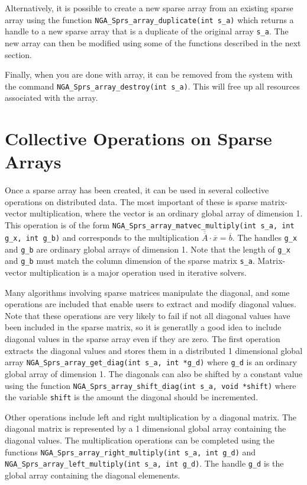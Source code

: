 Alternatively, it is possible to create a new sparse array from an existing
sparse array using the function \texttt{NGA\_Sprs\_array\_duplicate(int s\_a)}
which returns a handle to a new sparse array that is a duplicate of the original
array \texttt{s\_a}. The new array can then be modified using some of the
functions described in the next section.

Finally, when you are done with array, it can be removed from the system with
the command \texttt{NGA\_Sprs\_array\_destroy(int s\_a)}. This will free up all
resources associated with the array.

\section{Collective Operations on Sparse Arrays}

Once a sparse array has been created, it can be used in several collective
operations on distributed data. The most important of these is sparse
matrix-vector multiplication, where the vector is an ordinary global array of
dimension 1. This operation is of the form
\texttt{NGA\_Sprs\_array\_matvec\_multiply(int s\_a, int g\_x, int g\_b)}
and corresponds to the multiplication $\overline{\overline{A}}\cdot\overline{x}
=\overline{b}$. The handles \texttt{g\_x} and \texttt{g\_b} are ordinary global
arrays of dimension 1. Note that the length of \texttt{g\_x} and \texttt{g\_b}
must match the column dimension of the sparse matrix \texttt{s\_a}. Matrix-vector
multiplication is a major operation used in iterative solvers.

Many algorithms involving sparse matrices manipulate the diagonal,
and some operations are included that enable users to extract and modify
diagonal values. Note that these operations are very likely to fail if not all
diagonal values have been included in the sparse matrix, so it is generatlly a
good idea to include diagonal values in the sparse array even if they are zero.
The first operation extracts the diagonal values and stores them in a
distributed 1 dimensional global array \texttt{NGA\_Sprs\_array\_get\_diag(int
s\_a, int *g\_d)} where \texttt{g\_d} is an ordinary global array of dimension
1.  The diagonals can also be shifted by a constant value using the function
\texttt{NGA\_Sprs\_array\_shift\_diag(int s\_a, void *shift)} where the variable
\texttt{shift} is the amount the diagonal should be incremented.

Other operations include left and right multiplication by a diagonal matrix. The
diagonal matrix is represented by a 1 dimensional global array containing the
diagonal values. The multiplication operations can be completed using the
functions \texttt{NGA\_Sprs\_array\_right\_multiply(int s\_a, int g\_d)} and
\texttt{NGA\_Sprs\_array\_left\_multiply(int s\_a, int g\_d)}. The handle
\texttt{g\_d} is the global array containing the diagonal elemenents.

